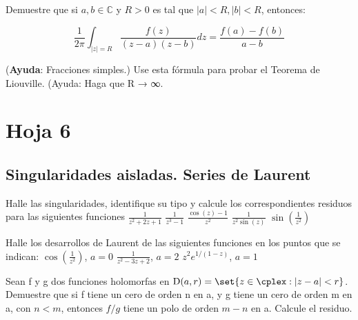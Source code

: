 \begin{problem}
Demuestre que si $a,b∈ℂ$ y $R>0$ es tal que $|a| < R, |b| < R$, entonces:

\[
\frac{1}{2π}\int_{|z| = R} \frac{f(z)}{(z-a)(z-b)} dz = \frac{f(a) - f(b)}{a-b}
\]

(\textbf{Ayuda}: Fracciones simples.) Use esta fórmula para probar el Teorema de Liouville. (Ayuda:
Haga que R → ∞.

\solution

\end{problem}
\newpage
\section{Hoja 6}
\subsection{Singularidades aisladas. Series de Laurent}
\begin{problem}
Halle las singularidades, identifique su tipo y calcule los correspondientes residuos para las siguientes funciones
\ppart $\frac{1}{z^2 + 2z + 1}$
\ppart $\frac{1}{z^3 - 1}$
\ppart $\frac{\cos(z) - 1}{z^2}$
\ppart $\frac{1}{z^2 \sin(z)}$
\ppart $\sin(\frac{1}{z^2})$

\solution

\end{problem}


\begin{problem}
Halle los desarrollos de Laurent de las siguientes funciones en los puntos que se indican:
\ppart $\cos (\frac{1}{z^2})$, $a = 0$
\ppart $\frac{1}{z^2 - 3z + 2}$, $a = 2$
\ppart $z^2 e^{1/(1 - z)}$, $a = 1$

\solution

\end{problem}

\begin{problem}
Sean f y g dos funciones holomorfas en ${\mbox D(a, r) = \set{z \in \cplex : |z - a| < r}}$. Demuestre que si f tiene un cero de orden n en a, y g tiene un cero de orden m en a, con $n < m$, entonces $f / g$ tiene un polo de orden $m - n$ en a. Calcule el residuo.
\solution

\end{problem}

